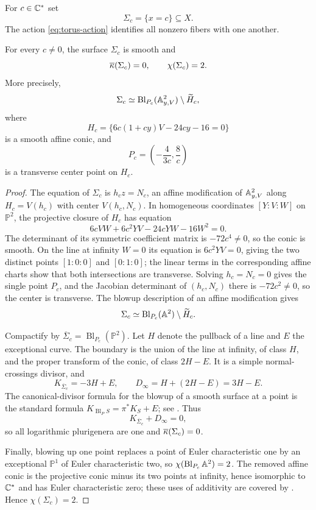 \begin{notation}\label{not:sigma-c}
For $c\in\mathbb C^*$ set
\[
  \Sigma_c=\{x=c\}\subseteq X.
\]
The action \eqref{eq:torus-action} identifies all nonzero fibers with one another.
\end{notation}

\begin{proposition}\label{prop:surface-kappa}
For every $c\neq0$, the surface $\Sigma_c$ is smooth and
\[
  \overline\kappa(\Sigma_c)=0,
  \qquad
  \chi(\Sigma_c)=2.
\]
More precisely,
\[
  \Sigma_c\simeq\operatorname{Bl}_{P_c}(\mathbb A^2_{y,V})\setminus\widetilde H_c,
\]
where
\[
  H_c=\{6c(1+cy)V-24cy-16=0\}
\]
is a smooth affine conic, and
\[
  P_c=\left(-\frac4{3c},\frac8c\right)
\]
is a transverse center point on $H_c$.
\end{proposition}

\begin{proof}
The equation of $\Sigma_c$ is $h_cz=N_c$, an affine modification of $\mathbb A^2_{y,V}$ along $H_c=V(h_c)$ with center $V(h_c,N_c)$.  In homogeneous coordinates $[Y:V:W]$ on $\mathbb P^2$, the projective closure of $H_c$ has equation
\[
  6cVW+6c^2YV-24cYW-16W^2=0.
\]
The determinant of its symmetric coefficient matrix is $-72c^4\neq0$, so the conic is smooth.  On the line at infinity $W=0$ its equation is $6c^2YV=0$, giving the two distinct points $[1:0:0]$ and $[0:1:0]$; the linear terms in the corresponding affine charts show that both intersections are transverse.  Solving $h_c=N_c=0$ gives the single point $P_c$, and the Jacobian determinant of $(h_c,N_c)$ there is $-72c^2\neq0$, so the center is transverse.  The blowup description of an affine modification \cite[Section 1]{KalimanZaidenberg1999} gives
\[
  \Sigma_c\simeq\operatorname{Bl}_{P_c}(\mathbb A^2)\setminus\widetilde H_c.
\]

Compactify by $\overline\Sigma_c=\operatorname{Bl}_{P_c}(\mathbb P^2)$.  Let $H$ denote the pullback of a line and $E$ the exceptional curve.  The boundary is the union of the line at infinity, of class $H$, and the proper transform of the conic, of class $2H-E$.  It is a simple normal-crossings divisor, and
\[
  K_{\overline\Sigma_c}= -3H+E,
  \qquad
  D_{\infty}=H+(2H-E)=3H-E.
\]
The canonical-divisor formula for the blowup of a smooth surface at a point is the standard formula $K_{\operatorname{Bl}_P S}=\pi^*K_S+E$; see \cite[Chapter II, Exercise 8.5]{Hartshorne1977}.  Thus
\[
  K_{\overline\Sigma_c}+D_{\infty}=0,
\]
so all logarithmic plurigenera are one and $\overline\kappa(\Sigma_c)=0$.

Finally, blowing up one point replaces a point of Euler characteristic one by an exceptional $\mathbb P^1$ of Euler characteristic two, so $\chi(\operatorname{Bl}_{P_c}\mathbb A^2)=2$.  The removed affine conic is the projective conic minus its two points at infinity, hence isomorphic to $\mathbb C^*$ and has Euler characteristic zero; these uses of additivity are covered by \cite[Chapter 4]{Dimca2004}.  Hence $\chi(\Sigma_c)=2$.
\end{proof}

